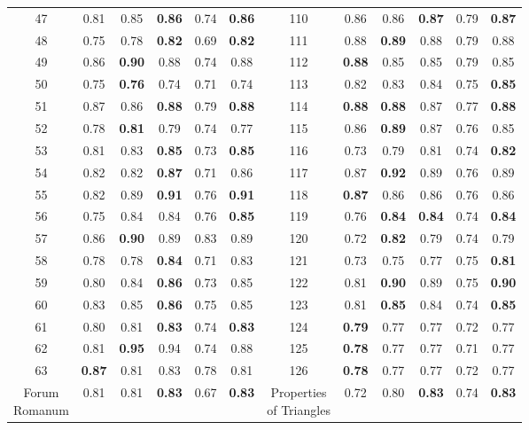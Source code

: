 \documentclass{article}
\begin{document}
{\begin{longtable}{cccccc@{\qquad}cccccc}
47 & 0.81 & 0.85 & \textbf{0.86} & 0.74 & \textbf{0.86} & 110 & 0.86 & 0.86 & \textbf{0.87} & 0.79 & \textbf{0.87} \\
48 & 0.75 & 0.78 & \textbf{0.82} & 0.69 & \textbf{0.82} & 111 & 0.88 & \textbf{0.89} & 0.88 & 0.79 & 0.88 \\
49 & 0.86 & \textbf{0.90} & 0.88 & 0.74 & 0.88 & 112 & \textbf{0.88} & 0.85 & 0.85 & 0.79 & 0.85 \\
50 & 0.75 & \textbf{0.76} & 0.74 & 0.71 & 0.74 & 113 & 0.82 & 0.83 & 0.84 & 0.75 & \textbf{0.85} \\
51 & 0.87 & 0.86 & \textbf{0.88} & 0.79 & \textbf{0.88} & 114 & \textbf{0.88} & \textbf{0.88} & 0.87 & 0.77 & \textbf{0.88} \\
52 & 0.78 & \textbf{0.81} & 0.79 & 0.74 & 0.77 & 115 & 0.86 & \textbf{0.89} & 0.87 & 0.76 & 0.85 \\
53 & 0.81 & 0.83 & \textbf{0.85} & 0.73 & \textbf{0.85} & 116 & 0.73 & 0.79 & 0.81 & 0.74 & \textbf{0.82} \\
54 & 0.82 & 0.82 & \textbf{0.87} & 0.71 & 0.86 & 117 & 0.87 & \textbf{0.92} & 0.89 & 0.76 & 0.89 \\
55 & 0.82 & 0.89 & \textbf{0.91} & 0.76 & \textbf{0.91} & 118 & \textbf{0.87} & 0.86 & 0.86 & 0.76 & 0.86 \\
56 & 0.75 & 0.84 & 0.84 & 0.76 & \textbf{0.85} & 119 & 0.76 & \textbf{0.84} & \textbf{0.84} & 0.74 & \textbf{0.84} \\
57 & 0.86 & \textbf{0.90} & 0.89 & 0.83 & 0.89 & 120 & 0.72 & \textbf{0.82} & 0.79 & 0.74 & 0.79 \\
58 & 0.78 & 0.78 & \textbf{0.84} & 0.71 & 0.83 & 121 & 0.73 & 0.75 & 0.77 & 0.75 & \textbf{0.81} \\
59 & 0.80 & 0.84 & \textbf{0.86} & 0.73 & 0.85 & 122 & 0.81 & \textbf{0.90} & 0.89 & 0.75 & \textbf{0.90} \\
60 & 0.83 & 0.85 & \textbf{0.86} & 0.75 & 0.85 & 123 & 0.81 & \textbf{0.85} & 0.84 & 0.74 & \textbf{0.85} \\
61 & 0.80 & 0.81 & \textbf{0.83} & 0.74 & \textbf{0.83} & 124 & \textbf{0.79} & 0.77 & 0.77 & 0.72 & 0.77 \\
62 & 0.81 & \textbf{0.95} & 0.94 & 0.74 & 0.88 & 125 & \textbf{0.78} & 0.77 & 0.77 & 0.71 & 0.77 \\
63 & \textbf{0.87} & 0.81 & 0.83 & 0.78 & 0.81 & 126 & \textbf{0.78} & 0.77 & 0.77 & 0.72 & 0.77 \\
\makecell[c]{Forum \\ Romanum} & 0.81 & 0.81 & \textbf{0.83} & 0.67 & \textbf{0.83} & \makecell[c]{Properties \\ of Triangles} & 0.72 & 0.80 & \textbf{0.83} & 0.74 & \textbf{0.83} \\

\end{longtable}}
\end{document}
